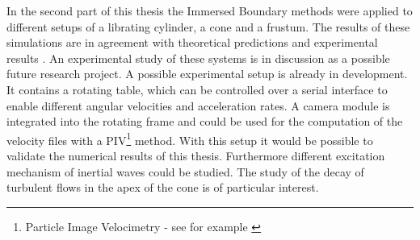 In the second part of this thesis the Immersed Boundary methods were applied to different setups of a librating cylinder,  a cone and a frustum.
The results of these simulations are in agreement with theoretical
predictions \citep{Greenspan1969} and experimental results \cite{Beardsley1970}.
An experimental study of these systems is in discussion as a possible future research project.
A possible experimental setup is already in development.
It contains a rotating table, which can be controlled over a serial interface to enable different angular velocities and acceleration rates.
A camera module is integrated into the rotating frame and could be used for the computation
of the velocity files with a PIV\footnote{Particle Image Velocimetry  - see for example \citep{CTIE} }
method.
With this setup it would be possible to validate the numerical results of this thesis.
Furthermore different excitation mechanism of inertial waves could be studied.
The study of the decay of turbulent flows in the apex of the cone is of particular interest.



